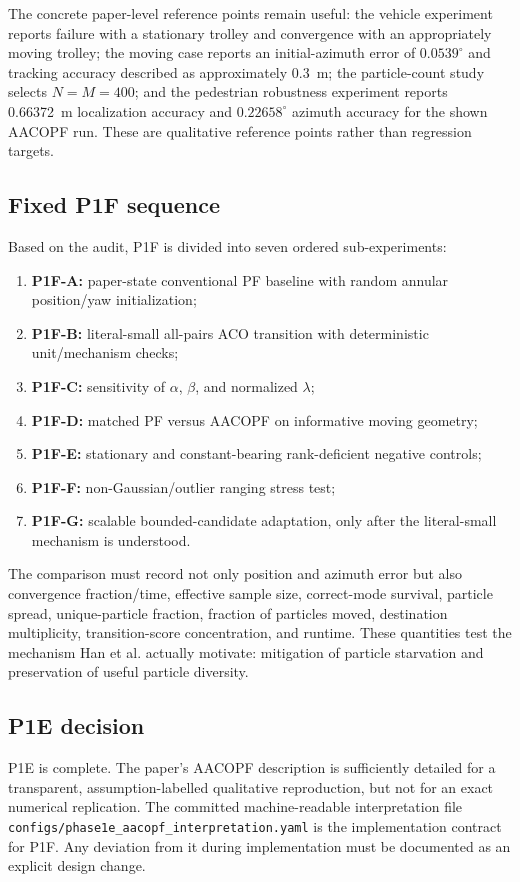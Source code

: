 The concrete paper-level reference points remain useful: the vehicle experiment reports failure with a stationary trolley and convergence with an appropriately moving trolley; the moving case reports an initial-azimuth error of $0.0539^\circ$ and tracking accuracy described as approximately \SI{0.3}{m}; the particle-count study selects $N=M=400$; and the pedestrian robustness experiment reports \SI{0.66372}{m} localization accuracy and $0.22658^\circ$ azimuth accuracy for the shown AACOPF run. These are qualitative reference points rather than regression targets.

\subsection{Fixed P1F sequence}
Based on the audit, P1F is divided into seven ordered sub-experiments:
\begin{enumerate}
    \item \textbf{P1F-A:} paper-state conventional PF baseline with random annular position/yaw initialization;
    \item \textbf{P1F-B:} literal-small all-pairs ACO transition with deterministic unit/mechanism checks;
    \item \textbf{P1F-C:} sensitivity of $\alpha$, $\beta$, and normalized $\lambda$;
    \item \textbf{P1F-D:} matched PF versus AACOPF on informative moving geometry;
    \item \textbf{P1F-E:} stationary and constant-bearing rank-deficient negative controls;
    \item \textbf{P1F-F:} non-Gaussian/outlier ranging stress test;
    \item \textbf{P1F-G:} scalable bounded-candidate adaptation, only after the literal-small mechanism is understood.
\end{enumerate}

The comparison must record not only position and azimuth error but also convergence fraction/time, effective sample size, correct-mode survival, particle spread, unique-particle fraction, fraction of particles moved, destination multiplicity, transition-score concentration, and runtime. These quantities test the mechanism Han et al. actually motivate: mitigation of particle starvation and preservation of useful particle diversity.

\subsection{P1E decision}
P1E is complete. The paper's AACOPF description is sufficiently detailed for a transparent, assumption-labelled qualitative reproduction, but not for an exact numerical replication. The committed machine-readable interpretation file \texttt{configs/phase1e\_aacopf\_interpretation.yaml} is the implementation contract for P1F. Any deviation from it during implementation must be documented as an explicit design change.

